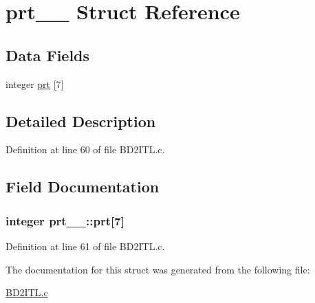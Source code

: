 \hypertarget{structprt__1__}{}\section{prt\+\_\+\_\+ Struct Reference}
\label{structprt__1__}
\subsection*{Data Fields}
\begin{DoxyCompactItemize}
\item 
integer \hyperlink{structprt__1___add9952251ecb2e1f6653918fec0eb154}{prt} \mbox{[}7\mbox{]}
\end{DoxyCompactItemize}


\subsection{Detailed Description}


Definition at line 60 of file B\+D2\+I\+T\+L.\+c.



\subsection{Field Documentation}
\subsubsection[{\texorpdfstring{prt}{prt}}]{\setlength{\rightskip}{0pt plus 5cm}integer prt\+\_\+\_\+\+::prt\mbox{[}7\mbox{]}}\hypertarget{structprt__1___add9952251ecb2e1f6653918fec0eb154}{}\label{structprt__1___add9952251ecb2e1f6653918fec0eb154}


Definition at line 61 of file B\+D2\+I\+T\+L.\+c.



The documentation for this struct was generated from the following file\+:\begin{DoxyCompactItemize}
\item 
\hyperlink{BD2ITL_8c}{B\+D2\+I\+T\+L.\+c}\end{DoxyCompactItemize}
